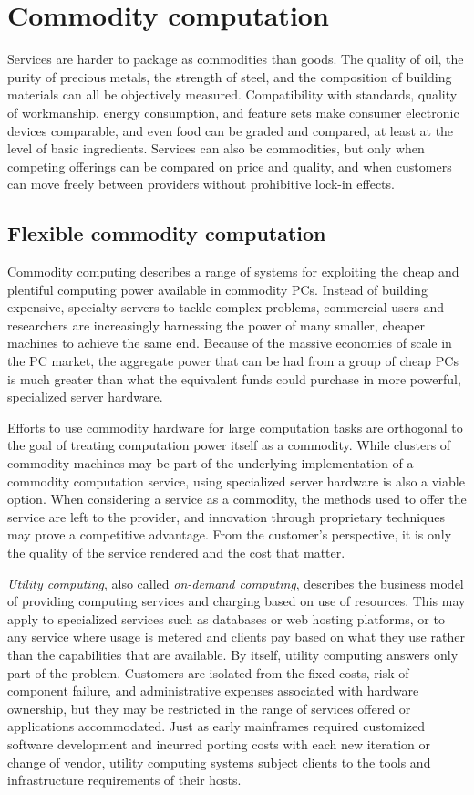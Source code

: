 \section{Commodity computation}

Services are harder to package as commodities than goods. The quality of oil, the purity of precious metals, the strength of steel, and the composition of building materials can all be objectively measured. Compatibility with standards, quality of workmanship, energy consumption, and feature sets make consumer electronic devices comparable, and even food can be graded and compared, at least at the level of basic ingredients. Services can also be commodities, but only when competing offerings can be compared on price and quality, and when customers can move freely between providers without prohibitive lock-in effects.

\subsection{Flexible commodity computation}

Commodity computing describes a range of systems for exploiting the cheap and plentiful computing power available in commodity PCs. Instead of building expensive, specialty servers to tackle complex problems, commercial users and researchers are increasingly harnessing the power of many smaller, cheaper machines to achieve the same end. Because of the massive economies of scale in the PC market, the aggregate power that can be had from a group of cheap PCs is much greater than what the equivalent funds could purchase in more powerful, specialized server hardware.

Efforts to use commodity hardware for large computation tasks are orthogonal to the goal of treating computation power itself as a commodity. While clusters of commodity machines may be part of the underlying implementation of a commodity computation service, using specialized server hardware is also a viable option. When considering a service as a commodity, the methods used to offer the service are left to the provider, and innovation through proprietary techniques may prove a competitive advantage. From the customer's perspective, it is only the quality of the service rendered and the cost that matter.

\emph{Utility computing}, also called \emph{on-demand computing}, describes the business model of providing computing services and charging based on use of resources. This may apply to specialized services such as databases or web hosting platforms, or to any service where usage is metered and clients pay based on what they use rather than the capabilities that are available. By itself, utility computing answers only part of the problem. Customers are isolated from the fixed costs, risk of component failure, and administrative expenses associated with hardware ownership, but they may be restricted in the range of services offered or applications accommodated. Just as early mainframes required customized software development and incurred porting costs with each new iteration or change of vendor, utility computing systems subject clients to the tools and infrastructure requirements of their hosts.

